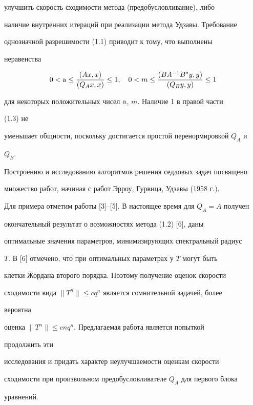 улучшить скорость сходимости метода (предобусловливание), либо 


наличие внутренних итераций при реализации метода Удзавы. Требование 


однозначной разрешимости (1.1) приводит к тому, что выполнены 


неравенства 


\begin{equation} 


0<\A\le\frac{(Ax,x)}{(Q_A x,x)}\le1,\quad 


0<m\le\frac{(B A^{-1}B^*y,y)}{(Q_B y,y)}\le1 


\end{equation} 


для некоторых положительных чисел $\mathrm a$, $m$. Наличие 1 в правой части 


(1.3) не 


уменьшает общности, поскольку достигается простой перенормировкой $Q_A$ и 


$Q_B$. 


 


Построению и исследованию алгоритмов решения седловых задач посвящено 


множество работ, начиная с работ Эрроу, Гурвица, Удзавы (1958 г.). 


Для примера отметим работы [3]--[5]. В настоящее время для $Q_A=A$ получен 


окончательный результат о возможностях метода (1.2) [6], даны 


оптимальные значения параметров, минимизирующих спектральный радиус 


$T$. В [6] отмечено, что при оптимальных параметрах у $T$ могут быть 


клетки Жордана второго порядка. Поэтому получение оценок скорости 


сходимости вида $\|T^n\|\le c q^n$ является сомнительной задачей, более 


вероятна 


оценка $\|T^n\|\le c n q^n$. Предлагаемая работа является попыткой 


продолжить эти 


исследования и придать характер неулучшаемости оценкам скорости 


сходимости при произвольном предобусловливателе $Q_A$ для первого блока 


уравнений. 


 


